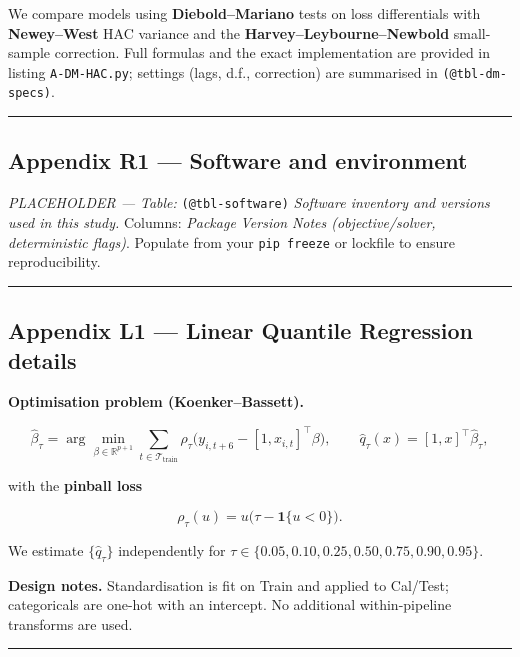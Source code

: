 \documentclass[
  a4paper,
  DIV=11,
  numbers=noendperiod]{scrreprt}
\begin{document}
We compare models using \textbf{Diebold--Mariano} tests on loss
differentials with \textbf{Newey--West} HAC variance and the
\textbf{Harvey--Leybourne--Newbold} small-sample correction. Full
formulas and the exact implementation are provided in listing
\texttt{A-DM-HAC.py}; settings (lags, d.f., correction) are summarised
in \texttt{(@tbl-dm-specs)}.

\begin{center}\rule{0.5\linewidth}{0.5pt}\end{center}

\subsection{Appendix R1 --- Software and
environment}\label{app-r1-software}

\emph{PLACEHOLDER --- Table:} \texttt{(@tbl-software)} \emph{Software
inventory and versions used in this study.} Columns: \emph{Package}
\textbar{} \emph{Version} \textbar{} \emph{Notes (objective/solver,
deterministic flags)}. Populate from your \texttt{pip\ freeze} or
lockfile to ensure reproducibility.

\begin{center}\rule{0.5\linewidth}{0.5pt}\end{center}

\subsection{Appendix L1 --- Linear Quantile Regression
details}\label{app-l1-lqr}

\textbf{Optimisation problem (Koenker--Bassett).}

\[
\label{eq-lqr-program}
\widehat{\beta}_\tau
=\arg\min_{\beta\in\mathbb{R}^{p+1}}
\sum_{t\in\mathcal{T}_{\text{train}}}
\rho_\tau\!\big(y_{i,t+6}-[1,x_{i,t}]^\top\beta\big),\qquad
\widehat q_\tau(x)=[1,x]^\top\widehat{\beta}_\tau,
\]

with the \textbf{pinball loss}

\[
\label{eq-pinball-app}
\rho_\tau(u)=u\big(\tau-\mathbf{1}\{u<0\}\big).
\]

We estimate \(\{\widehat q_\tau\}\) independently for
\(\tau\in\{0.05,0.10,0.25,0.50,0.75,0.90,0.95\}\).

\textbf{Design notes.} Standardisation is fit on Train and applied to
Cal/Test; categoricals are one-hot with an intercept. No additional
within-pipeline transforms are used.

\begin{center}\rule{0.5\linewidth}{0.5pt}\end{center}
\end{document}
